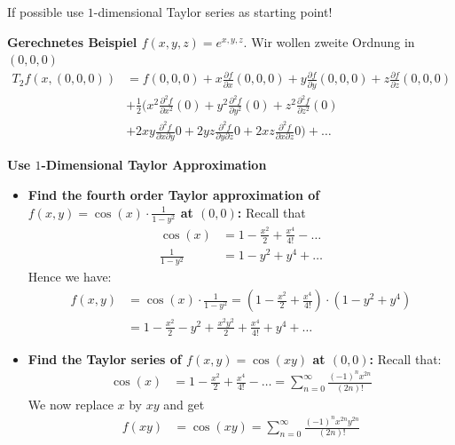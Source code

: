 \documentclass[25pt]{sciposter}
\newenvironment{important}{\begin{mdframed}[backgroundcolor=red!50,innertopmargin=15pt, innerbottommargin=15pt, nobreak=true]
		\Large
	}
	{ 
	\end{mdframed}
}
\begin{document}
\begin{multicols}{3}
\begin{important}
If possible use $1$-dimensional Taylor series as starting point!
\end{important}

\textbf{Gerechnetes Beispiel $f(x,y,z) = e^{x,y,z}$}. Wir wollen zweite Ordnung in $(0,0,0)$
\begin{align*}
	T_2 f(x,(0,0,0)) &= f(0,0,0) + x\frac{\partial f}{\partial x} (0,0,0) + y\frac{\partial f}{\partial y} (0,0,0) +  z\frac{\partial f}{\partial z} (0,0,0)\\
	&+ \frac{1}{2} \biggl( x^2\frac{\partial^2 f}{\partial x^2} (0) + y^2\frac{\partial^2 f}{\partial y^2} (0) + z^2\frac{\partial^2 f}{\partial z^2} (0)  \\
	&+ 2xy \frac{\partial^2 f}{\partial x \partial y} 0 + 2yz \frac{\partial^2 f}{\partial y \partial z} 0 + 2xz \frac{\partial^2 f}{\partial x \partial z} 0 \biggr) + \ldots 
\end{align*}


\textbf{Use $1$-Dimensional Taylor Approximation}
\begin{itemize}
	\item \textbf{Find the fourth order Taylor approximation of $f(x,y) = \cos(x)\cdot \frac{1}{1-y^2}$ at $(0,0)$:} Recall that
	\begin{align*}
			\cos(x) &= 1 - \frac{x^2}{2} + \frac{x^4}{4!} - \ldots \\
			\frac{1}{1-y^2} &= 1 -y^2 + y^4 + \ldots 
	\end{align*}
	Hence we have:
	\begin{align*}
	f(x,y) &= \cos(x) \cdot \frac{1}{1-y^2} = \left( 1 - \frac{x^2}{2} + \frac{x^4}{4!} \right) \cdot \left( 1 -y^2 + y^4   \right)\\
	&= 1 - \frac{x^2}{2} - y^2 + \frac{x^2 y^2}{2} + \frac{x^4}{4!} + y^4 + \ldots
	\end{align*}
	
	
	
	\item \textbf{Find the Taylor series of $f(x,y) = \cos(xy)$ at $(0,0)$:} Recall that:
	\begin{align*}
		\cos(x) &= 1 - \frac{x^2}{2} + \frac{x^4}{4!} - \ldots = \sum_{n=0}^{\infty} \frac{(-1)^n x^{2n}}{(2n)!}
	\end{align*}
	We now replace $x$ by $xy$ and get
	\begin{align*}
	f(xy) &= \cos(xy) = \sum_{n=0}^{\infty} \frac{(-1)^n x^{2n} y^{2n}}{(2n)!}
	\end{align*}
\end{itemize}



\end{multicols}
\end{document}
